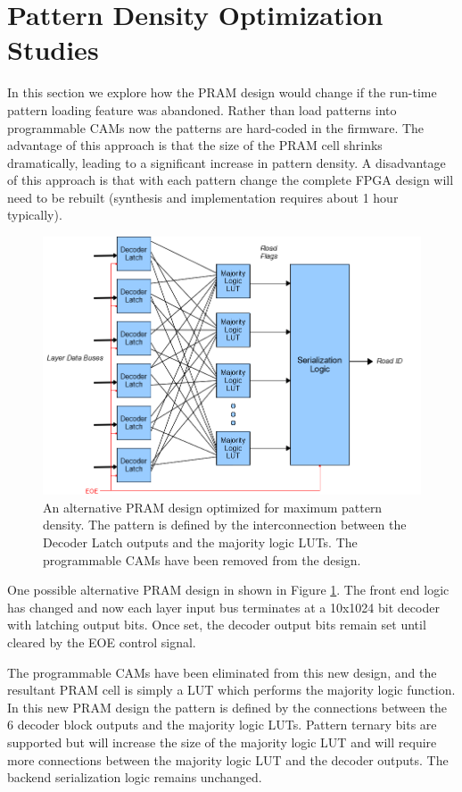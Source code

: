 \documentclass[letterpaper]{article}
\begin{document}
\section{Pattern Density Optimization Studies}

In this section we explore how the PRAM design would change if the run-time pattern loading feature was abandoned. Rather than load patterns into programmable CAMs now the patterns are hard-coded in the firmware. The advantage of this approach is that the size of the PRAM cell shrinks dramatically, leading to a significant increase in pattern density. A disadvantage of this approach is that with each pattern change the complete FPGA design will need to be rebuilt (synthesis and implementation requires about 1 hour typically).

\begin{figure}
\centering
\includegraphics[width=14cm]{densepram.png}
\caption[PRAM Designed for Maximum Pattern Density]{An alternative PRAM design optimized for maximum pattern density. The pattern is defined by the interconnection between the Decoder Latch outputs and the majority logic LUTs. The programmable CAMs have been removed from the design.}
\label{densepram}
\end{figure}

One possible alternative PRAM design in shown in Figure \ref{densepram}. The front end logic has changed and now each layer input bus terminates at a 10x1024 bit decoder with latching output bits. Once set, the decoder output bits remain set until cleared by the EOE control signal. 

The programmable CAMs have been eliminated from this new design, and the resultant PRAM cell is simply a LUT which performs the majority logic function. In this new PRAM design the pattern is defined by the connections between the 6 decoder block outputs and the majority logic LUTs. Pattern ternary bits are supported but will increase the size of the majority logic LUT and will require more connections between the majority logic LUT and the decoder outputs. The backend serialization logic remains unchanged.
\end{document}
